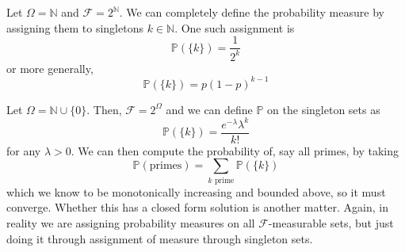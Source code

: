 \documentclass{article}
\begin{document}
      \begin{example}
        Let $\Omega = \mathbb{N}$ and $\mathcal{F} = 2^\mathbb{N}$. We can completely define the probability measure by assigning them to singletons $k \in \mathbb{N}$. One such assignment is 
        \begin{equation}
          \mathbb{P}(\{k\}) = \frac{1}{2^k}
        \end{equation}
        or more generally, 
        \begin{equation}
          \mathbb{P}(\{k\}) = p (1 - p)^{k-1}
        \end{equation}
      \end{example}

      \begin{example}
        Let $\Omega = \mathbb{N} \cup \{0\}$. Then, $\mathcal{F} = 2^\Omega$ and we can define $\mathbb{P}$ on the singleton sets as 
        \begin{equation}
          \mathbb{P}(\{k\}) = \frac{e^{-\lambda} \lambda^k}{k!}
        \end{equation}
        for any $\lambda > 0$. We can then compute the probability of, say all primes, by taking 
        \begin{equation}
          \mathbb{P}(\text{primes}) = \sum_{k \text{ prime}} \mathbb{P}(\{k\})
        \end{equation}
        which we know to be monotonically increasing and bounded above, so it must converge. Whether this has a closed form solution is another matter. Again, in reality we are assigning probability measures on all $\mathcal{F}$-measurable sets, but just doing it through assignment of measure through singleton sets. 
      \end{example}
      
\end{document}
